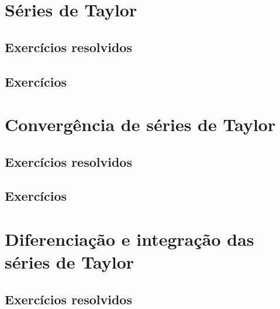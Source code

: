 \construirExer


\section{Séries de Taylor}
\construirSec

\subsection*{Exercícios resolvidos}

\construirExeresol


\subsection*{Exercícios}

\construirExer


\section{Convergência de séries de Taylor}
\construirSec

\subsection*{Exercícios resolvidos}

\construirExeresol


\subsection*{Exercícios}

\construirExer


\section{Diferenciação e integração das séries de Taylor}
\construirSec

\subsection*{Exercícios resolvidos}

